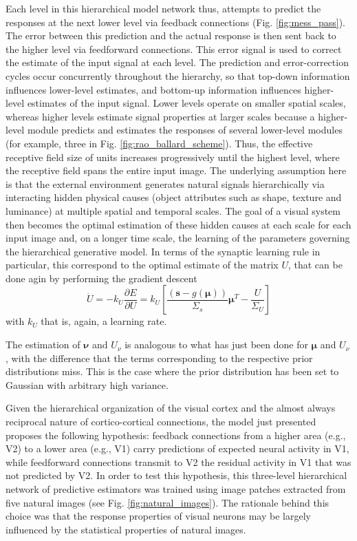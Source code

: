 \documentclass[10pt]{article}
\begin{document}
Each level in this hierarchical model network thus, attempts to predict the responses at the next lower level via feedback connections (Fig. \ref{fig:mess_pass}). The error between this prediction and the actual response is then sent back to the higher level via feedforward connections. This error signal is used to correct the estimate of the input signal at each
level. The prediction and error-correction cycles occur concurrently throughout the hierarchy, so that top-down information influences lower-level estimates, and bottom-up information influences higher-level estimates of the input signal. Lower levels operate on smaller spatial scales, whereas higher levels estimate signal properties at larger scales because a higher-level module predicts and estimates the responses of several lower-level modules (for example, three in Fig. \ref{fig:rao_ballard_scheme}). Thus, the effective receptive field size of units increases progressively until the highest level, where the receptive field spans the entire input image. The underlying assumption here is that the external environment generates natural signals hierarchically via interacting hidden physical causes (object attributes such as shape, texture and luminance) at multiple spatial and temporal scales. 
The goal of a visual system then becomes the optimal estimation of these hidden causes at each scale for each input image and, on a longer time scale, the learning of the parameters governing the hierarchical generative model. In terms of the synaptic learning rule in particular, this correspond to the optimal estimate of the matrix $U$, that can be done agin by performing the gradient descent
\begin{equation}
    \dot{U} = - k_U \frac{\partial E}{\partial U} = k_U \left[ \frac{(\bm{s} - g(\bm{\mu}) )}{\Sigma_s} \bm{\mu}^T - \frac{U}{\Sigma_{U}} \right]
    \label{eq:learnin_u}
\end{equation}
with $k_U$ that is, again, a learning rate.

The estimation of $\bm{\nu}$ and $U_{\nu}$ is analogous to what has just been done for $\bm{\mu}$ and $U_{\nu}$, with the difference that the terms corresponding to the respective prior distributions miss. This is the case where the prior distribution has been set to Gaussian with arbitrary high variance.

Given the hierarchical organization of the visual cortex and the almost always reciprocal nature of cortico-cortical connections, the model just presented proposes the following hypothesis: feedback connections from a higher area (e.g., V2) to a lower area (e.g., V1) carry predictions of expected neural activity in V1, while feedforward connections transmit to V2 the residual activity in V1 that was not predicted by V2. In order to test this hypothesis, this three-level hierarchical network of predictive estimators was trained using image patches extracted from five natural images (see Fig. \ref{fig:natural_images}). The rationale behind this choice was that the response properties of visual neurons may be largely influenced by the statistical properties of natural images. 
\end{document}
